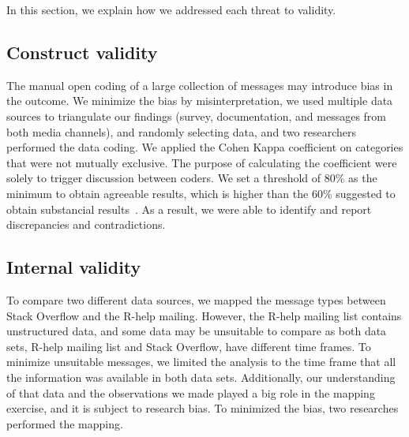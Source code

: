 \documentclass{sig-alternate-05-2015}
\begin{document}
In this section, we explain how we addressed each threat to
validity.

\subsection{Construct validity}

The manual open coding of a large collection of messages may introduce bias in the outcome.
We minimize the bias by misinterpretation, we used multiple data sources to triangulate our findings (survey, documentation, and messages from both media channels), and randomly selecting data, and two researchers performed the data coding.
We applied the Cohen Kappa coefficient on categories that were not mutually exclusive.
The purpose of calculating the coefficient were solely to trigger discussion between coders.
We set a threshold of 80\% as the minimum to obtain agreeable results, which is higher than the 60\% suggested to obtain substancial results~\cite{Landis1977}.
As a result, we were able to identify and report discrepancies and contradictions.

\subsection{Internal validity}


To compare two different data sources, we mapped the message types between Stack Overflow and the R-help mailing.
However, the R-help mailing list contains unstructured data, and some data may be unsuitable to compare as both data sets, R-help mailing list and Stack Overflow, have different time frames.
To minimize unsuitable messages, we limited the analysis to the time frame that all the information was available in both data sets.
Additionally, our understanding of that data and the observations we made played a big role in the mapping exercise, and it is subject to research bias.
To minimized the bias, two researches performed the mapping.
\end{document}
